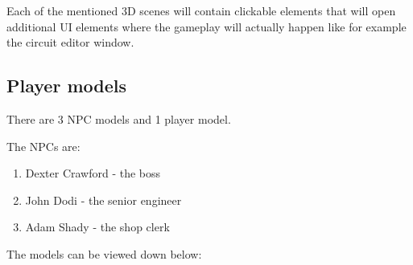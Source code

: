 \documentclass[12pt]{article}
\begin{document}
Each of the mentioned 3D scenes will contain clickable elements that will open additional UI elements where the gameplay will actually happen 
like for example the circuit editor window.

\subsection{Player models}

There are 3 NPC models and 1 player model.

The NPCs are:

\begin{enumerate}
    \item Dexter Crawford - the boss
    \item John Dodi - the senior engineer
    \item Adam Shady - the shop clerk
\end{enumerate}

The models can be viewed down below:
\end{document}
